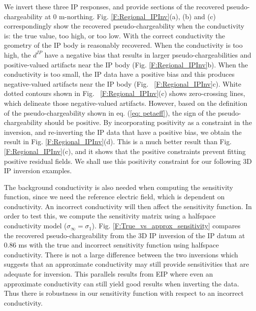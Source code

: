 \documentclass[extra,mreferee]{gji}
\newcommand{\siginf}{\sigma_\infty}
\newcommand{\dip}{d^{IP}}
\begin{document}
We invert these three IP responses, and provide sections of the recovered pseudo-chargeability at 0 m-northing.
Fig. \ref{F:Regional_IPInv}(a), (b) and (c) correspondingly show the recovered pseudo-chargeability when the conductivity is: the true value, too high, or too low.
With the correct conductivity the geometry of the IP body is reasonably recovered.
When the conductivity is too high, the $\dip$ have a negative bias that results in larger pseudo-chargeabilities and positive-valued artifacts near the IP body (Fig. \ref{F:Regional_IPInv}b).
When the conductivity is too small, the IP data have a positive bias and this produces  negative-valued artifacts near the IP body (Fig. ~\ref{F:Regional_IPInv}c). White dotted contours shown in Fig. ~\ref{F:Regional_IPInv}(c) shows zero-crossing lines, which delineate those negative-valued artifacts. However, based on the  definition of the pseudo-chargeability shown in eq. (\ref{eq: petaeff}), the sign of the pseudo-chargeability should be positive. By incorporating positivity as a constraint in the inversion, and re-inverting the IP data that have a positive bias, we obtain the result in  Fig. \ref{F:Regional_IPInv}(d).  This is a much better result than Fig. \ref{F:Regional_IPInv}(c), and it shows that the positive constraints prevent fitting positive residual fields.
 We shall use this positivity  constraint for our following 3D IP inversion examples.

The background conductivity is also needed when computing the sensitivity function, since we need the reference electric field, which is dependent on conductivity.
An incorrect conductivity will then affect the sensitivity function.
In order to test this, we compute the sensitivity matrix using a halfspace conductivity model ($\siginf = \sigma_1$).
Fig. \ref{F:True_vs_approx_sensitivity} compares the recovered pseudo-chargeability from the 3D IP inversion of the IP datum at 0.86 ms with the true and incorrect sensitivity function using halfspace conductivity.
There is not a large difference between the two inversions  which suggests that an approximate conductivity may still provide sensitivities that are adequate for inversion. This parallels results from EIP where even an approximate conductivity can still yield good results when inverting the data. Thus there is robustness in our sensitivity function with respect to an  incorrect conductivity.
\end{document}
